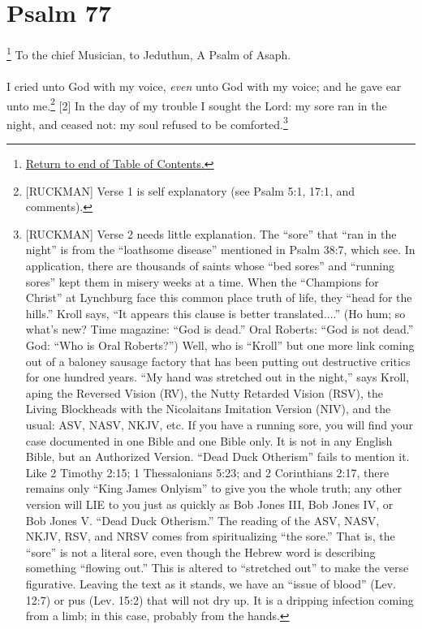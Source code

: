 \chapter{Psalm 77}

\footnote{\textcolor[rgb]{0.00,0.25,0.00}{\hyperlink{TOC}{Return to end of Table of Contents.}}}
\textcolor[rgb]{0.00,0.00,1.00}{To the chief Musician, to Jeduthun, A Psalm of Asaph.}\\
\\
\textcolor[rgb]{0.00,0.00,1.00}{I cried unto God with my voice, \emph{even} unto God with my voice; and he gave ear unto me.}\footnote{[RUCKMAN] Verse 1 is self explanatory (see Psalm 5:1, 17:1, and comments).\cite{Ruckman1992Psalms}}
[2] \textcolor[rgb]{0.00,0.00,1.00}{In the day of my trouble I sought the Lord: my sore ran in the night, and ceased not: my soul refused to be comforted.}\footnote{[RUCKMAN] Verse 2 needs little explanation. The “sore” that “ran in the night” is from the “loathsome disease” mentioned in Psalm 38:7, which see. In application, there are thousands of saints whose “bed sores” and “running sores” kept them in misery weeks at a time. When the “Champions for Christ” at Lynchburg face this common place truth of life, they “head for the hills.” Kroll says, “It appears this clause is better translated....” (Ho hum; so what’s new? Time magazine: “God is dead.” Oral Roberts: “God is not dead.” God: “Who is Oral Roberts?”) Well, who is “Kroll” but one more link coming out of a baloney sausage factory that has been putting out destructive critics for one hundred years. “My hand was stretched out in the night,” says Kroll, aping the Reversed Vision (RV), the Nutty Retarded Vision (RSV), the Living Blockheads with the Nicolaitans Imitation Version (NIV), and the usual: ASV, NASV, NKJV, etc. If you have a running sore, you will find your case documented in one Bible and one Bible only. It is not in any English Bible, but an Authorized Version. “Dead Duck Otherism” fails to mention it. Like 2 Timothy 2:15; 1 Thessalonians 5:23; and 2 Corinthians 2:17, there remains only “King James Onlyism” to give you the whole truth; any other version will LIE to you just as quickly as Bob Jones III, Bob Jones IV, or Bob Jones V. “Dead Duck Otherism.” The reading of the ASV, NASV, NKJV, RSV, and NRSV comes from spiritualizing “the sore.” That is, the “sore” is not a literal sore, even though the Hebrew word is describing something “flowing out.” This is altered to “stretched out” to make the verse figurative. Leaving the text as it stands, we have an “issue of blood” (Lev. 12:7) or pus (Lev. 15:2) that will not dry up. It is a dripping infection coming from a limb; in this case, probably from the hands.\cite{Ruckman1992Psalms} 
}
